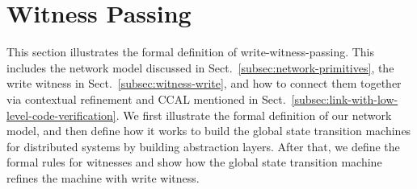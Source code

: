 
\section{Witness Passing}
\label{sec:witness-passing-semantics}

This section illustrates the formal definition of write-witness-passing.
This includes
the network model discussed in Sect.~\ref{subsec:network-primitives}, 
the write witness in Sect.~\ref{subsec:witness-write}, and 
how to connect them together via contextual refinement and CCAL mentioned in Sect.~\ref{subsec:link-with-low-level-code-verification}.
We first illustrate the formal definition of our network model,  and then define how it works to 
build the global state transition machines for distributed systems by
building abstraction layers.
After that, we define the formal rules for witnesses and show how the global state transition machine refines
the machine with write witness. 


